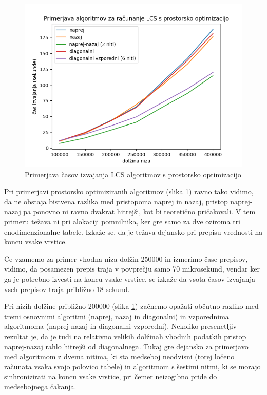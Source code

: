 \documentclass[a4paper,12pt,openright]{book}
\begin{document}
\begin{figure}[htb]
\centering
\includegraphics[width=1.0\textwidth]{plots/LCSspace.png}
\caption{Primerjava časov izvajanja LCS algoritmov s prostorsko optimizacijo}
\label{comparison2}
\end{figure}

Pri primerjavi prostorsko optimiziranih algoritmov (slika \ref{comparison2}) ravno tako vidimo, da ne obstaja bistvena razlika med pristopoma naprej in nazaj, pristop naprej-nazaj pa ponovno ni ravno dvakrat hitrejši, kot bi teoretično pričakovali. V tem primeru težava ni pri alokaciji pomnilnika, ker gre samo za dve oziroma tri enodimenzionalne tabele. Izkaže se, da je težava dejansko pri prepisu vrednosti na koncu vsake vrstice. 

Če vzamemo za primer vhodna niza dolžin 250000 in izmerimo čase prepisov, vidimo, da posamezen prepis traja v povprečju samo 70 mikrosekund, vendar ker ga je potrebno izvesti na koncu vsake vrstice, se izkaže da vsota časov izvajanja vseh prepisov traja približno 18 sekund. 

Pri nizih dolžine približno 200000 (slika \ref{comparison2}) začnemo opažati občutno razliko med tremi osnovnimi algoritmi (naprej, nazaj in diagonalni) in vzporednima algoritmoma (naprej-nazaj in diagonalni vzporedni). Nekoliko presenetljiv rezultat je, da je tudi na relativno velikih dolžinah vhodnih podatkih pristop naprej-nazaj rahlo hitrejši od diagonalnega. Tukaj gre dejansko za primerjavo med algoritmom z dvema nitima, ki sta medseboj neodvisni (torej ločeno računata vsaka svojo polovico tabele) in algoritmom s šestimi nitmi, ki se morajo sinhronizirati na koncu vsake vrstice, pri čemer neizogibno pride do medsebojnega čakanja. 
\end{document}
